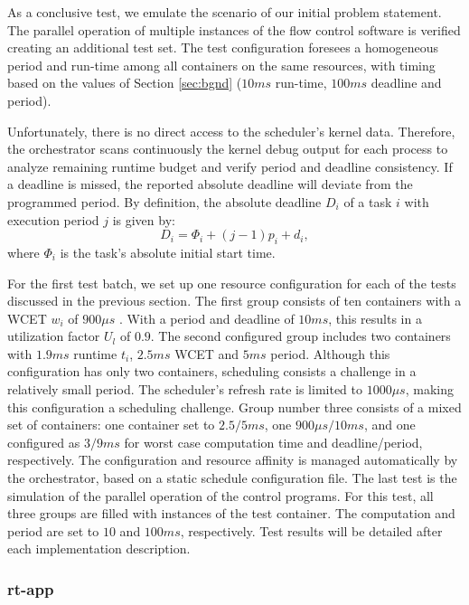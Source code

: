 \documentclass[]{scrartcl}
\begin{document}
As a conclusive test, we emulate the scenario of our initial problem statement. 
The parallel operation of multiple instances of the flow control software is verified creating an additional test set.
The test configuration foresees a homogeneous period and run-time among all containers on the same resources, with timing based on the values of Section \ref{sec:bgnd} ($10ms$ run-time, $100ms$ deadline and period).

Unfortunately, there is no direct access to the scheduler's kernel data.
Therefore, the orchestrator scans continuously the kernel debug output for each process to analyze remaining runtime budget and verify period and deadline consistency. 
If a deadline is missed, the reported absolute deadline will deviate from the programmed period. By definition, the absolute deadline $D_i$ of a task $i$ with execution period $j$ is given by:
\begin{equation}
D_i = \Phi_i + (j-1) p_i + d_i,
\end{equation}
where $\Phi_i$ is the task's absolute initial start time.

For the first test batch, we set up one resource configuration for each of the tests discussed in the previous section.
The first group consists of ten containers with a WCET $w_i$ of $900\mu s$ . 
With a period and deadline of $10ms$, this results in a utilization factor $U_l$ of $0.9$.
The second configured group includes two containers with $1.9ms$ runtime $t_i$, $2.5ms$ WCET and $5ms$ period.
Although this configuration has only two containers, scheduling consists a challenge in a relatively small period.
The scheduler's refresh rate is limited to $1000\mu s$, making this configuration a scheduling challenge.
Group number three consists of a mixed set of containers: one container set to $2.5/5ms$, one $900\mu s/10ms$, and one configured as $3/9ms$ for worst case computation time and deadline/period, respectively.
The configuration and resource affinity is managed automatically by the orchestrator, based on a static schedule configuration file.
The last test is the simulation of the parallel operation of the control programs. 
For this test, all three groups are filled with instances of the test container. 
The computation and period are set to $10$ and $100ms$, respectively.
Test results will be detailed after each implementation description.

\subsubsection{rt-app}
\end{document}
